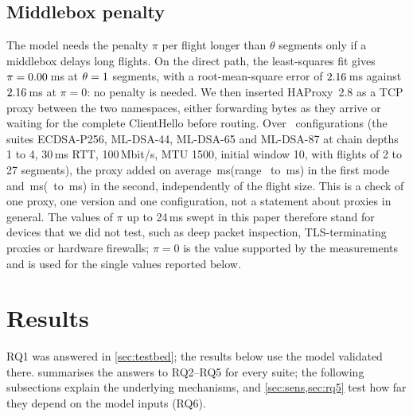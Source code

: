 \documentclass[preprint,12pt]{elsarticle}
\newcommand{\ms}{\,ms\xspace}
\begin{document}
\begin{table}[t]
\centering\small
\caption{Mean absolute error of the model against the testbed (ms), per suite (signature and key-exchange pair).}
\label{tab:testbed}

\end{table}

\subsection{Middlebox penalty}
The model needs the penalty $\pi$ per flight longer than $\theta$ segments only if a middlebox delays long flights. On the direct path, the least-squares fit gives $\pi=0.00$\ms at $\theta=1$ segments, with a root-mean-square error of $2.16$\ms against $2.16$\ms at $\pi=0$: no penalty is needed. We then inserted HAProxy~2.8 as a TCP proxy between the two namespaces, either forwarding bytes as they arrive or waiting for the complete ClientHello before routing. Over \tbProxyTcpN\ configurations (the suites ECDSA-P256, ML-DSA-44, ML-DSA-65 and ML-DSA-87 at chain depths 1 to 4, 30\ms RTT, 100\,Mbit/s, MTU 1500, initial window 10, with flights of 2 to 27 segments), the proxy added on average \tbProxyTcpMean\ms (range \tbProxyTcpLo\ to \tbProxyTcpHi\ms) in the first mode and \tbProxyInspectMean\ms (\tbProxyInspectLo\ to \tbProxyInspectHi\ms) in the second, independently of the flight size. This is a check of one proxy, one version and one configuration, not a statement about proxies in general. The values of $\pi$ up to 24\ms swept in this paper therefore stand for devices that we did not test, such as deep packet inspection, TLS-terminating proxies or hardware firewalls; $\pi=0$ is the value supported by the measurements and is used for the single values reported below.

\section{Results}
\label{sec:results}

RQ1 was answered in \cref{sec:testbed}; the results below use the model validated there.  summarises the answers to RQ2--RQ5 for every suite; the following subsections explain the underlying mechanisms, and \cref{sec:sens,sec:rq5} test how far they depend on the model inputs (RQ6).


\begin{table}[t]
\centering\small
\caption{Summary of results per suite. RQ2: cold SWIFT~MX transaction at depth 3. RQ3: latency added from depth 1 to 4 (SWIFT~MX). RQ4: share of cold configurations in which the transport overhead $O$ exceeds cryptographic time. RQ5: certificate bytes removed by compression. RQ6 is answered by the uncertainty analysis in \cref{sec:rq5}.}
\label{tab:master}
\resizebox{\textwidth}{!}{}
\end{table}
\end{document}

